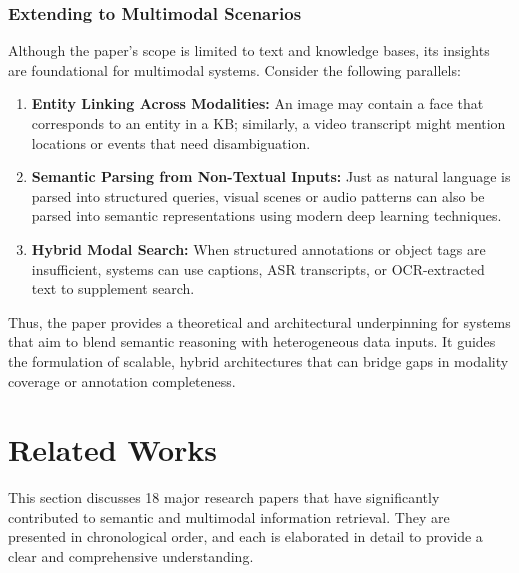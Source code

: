 \documentclass[conference]{IEEEtran}
\begin{document}
\subsubsection{Extending to Multimodal Scenarios}
Although the paper's scope is limited to text and knowledge bases, its insights are foundational for multimodal systems. Consider the following parallels:
\begin{enumerate}
    \item \textbf{Entity Linking Across Modalities:} An image may contain a face that corresponds to an entity in a KB; similarly, a video transcript might mention locations or events that need disambiguation.
    \item \textbf{Semantic Parsing from Non-Textual Inputs:} Just as natural language is parsed into structured queries, visual scenes or audio patterns can also be parsed into semantic representations using modern deep learning techniques.
    \item \textbf{Hybrid Modal Search:} When structured annotations or object tags are insufficient, systems can use captions, ASR transcripts, or OCR-extracted text to supplement search.
\end{enumerate}

Thus, the paper provides a theoretical and architectural underpinning for systems that aim to blend semantic reasoning with heterogeneous data inputs. It guides the formulation of scalable, hybrid architectures that can bridge gaps in modality coverage or annotation completeness.



\section{Related Works}

This section discusses 18 major research papers that have significantly contributed to semantic and multimodal information retrieval. They are presented in chronological order, and each is elaborated in detail to provide a clear and comprehensive understanding.
\end{document}
